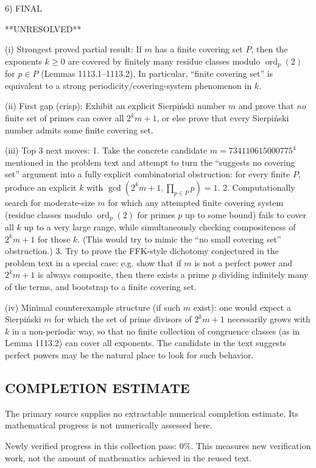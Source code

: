 6) FINAL

**UNRESOLVED**

(i) Strongest proved partial result: If \(m\) has a finite covering set \(P\), then the exponents \(k\ge 0\) are covered by finitely many residue classes modulo \(\operatorname{ord}_p(2)\) for \(p\in P\) (Lemmas 1113.1--1113.2). In particular, ``finite covering set'' is equivalent to a strong periodicity/covering-system phenomenon in \(k\).

(ii) First gap (crisp): Exhibit an explicit Sierpi\'nski number \(m\) and prove that \emph{no} finite set of primes can cover all \(2^k m+1\), or else prove that every Sierpi\'nski number admits some finite covering set.

(iii) Top 3 next moves:
1. Take the concrete candidate \(m=734110615000775^4\) mentioned in the problem text and attempt to turn the ``suggests no covering set'' argument into a fully explicit combinatorial obstruction: for every finite \(P\), produce an explicit \(k\) with \(\gcd(2^k m+1,\prod_{p\in P}p)=1\).
2. Computationally search for moderate-size \(m\) for which any attempted finite covering system (residue classes modulo \(\operatorname{ord}_p(2)\) for primes \(p\) up to some bound) fails to cover all \(k\) up to a very large range, while simultaneously checking compositeness of \(2^k m+1\) for those \(k\). (This would try to mimic the ``no small covering set'' obstruction.)
3. Try to prove the FFK-style dichotomy conjectured in the problem text in a special case: e.g. show that if \(m\) is not a perfect power and \(2^k m+1\) is always composite, then there exists a prime \(p\) dividing infinitely many of the terms, and bootstrap to a finite covering set.

(iv) Minimal counterexample structure (if such \(m\) exist): one would expect a Sierpi\'nski \(m\) for which the set of prime divisors of \(2^k m+1\) necessarily grows with \(k\) in a non-periodic way, so that no finite collection of congruence classes (as in Lemma 1113.2) can cover all exponents. The candidate in the text suggests perfect powers may be the natural place to look for such behavior.




\subsection*{COMPLETION ESTIMATE}
The primary source supplies no extractable numerical completion estimate. Its mathematical progress is not numerically assessed here.

Newly verified progress in this collection pass: $0\%$. This measures new verification work, not the amount of mathematics achieved in the reused text.
